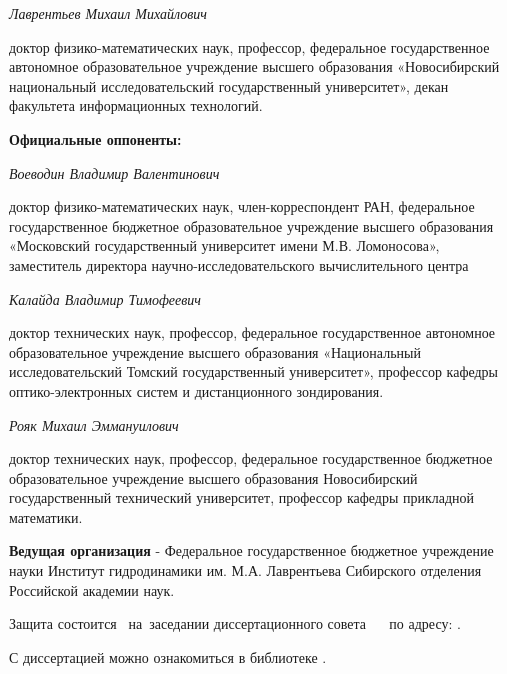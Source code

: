 \textit{Лаврентьев Михаил Михайлович}

доктор физико-математических наук, профессор, федеральное государственное автономное образовательное учреждение высшего образования «Новосибирский национальный исследовательский государственный университет», декан факультета информационных технологий.

\vspace{0.004\paperheight plus1fill}
\noindent%

\textbf{Официальные оппоненты:}

\textit{Воеводин Владимир Валентинович}

доктор физико-математических наук, член-корреспондент РАН,
федеральное государственное бюджетное образовательное учреждение высшего образования «Московский государственный университет имени
М.В. Ломоносова», заместитель директора научно-исследовательского вычислительного центра

\vspace{0.004\paperheight plus1fill}
\textit{Калайда Владимир Тимофеевич}

доктор технических наук, профессор, федеральное государственное автономное
образовательное учреждение высшего образования «Национальный
исследовательский Томский государственный университет»,
профессор кафедры оптико-электронных систем и дистанционного
зондирования.

\vspace{0.004\paperheight plus1fill}
\textit{Рояк Михаил Эммануилович}

доктор технических наук, профессор, федеральное государственное бюджетное образовательное учреждение высшего образования Новосибирский государственный технический университет, профессор кафедры прикладной математики.

\vspace{0.004\paperheight plus1fill}
\textbf{Ведущая организация} - Федеральное государственное бюджетное учреждение науки Институт гидродинамики им. М.А. Лаврентьева Сибирского отделения Российской академии наук.


\vspace{0.004\paperheight plus1fill}

\noindent Защита состоится ~на~заседании диссертационного совета ~ ~по адресу: .

\vspace{0.004\paperheight plus1fill}
\noindent С диссертацией можно ознакомиться в библиотеке \synopsisLibrary.

